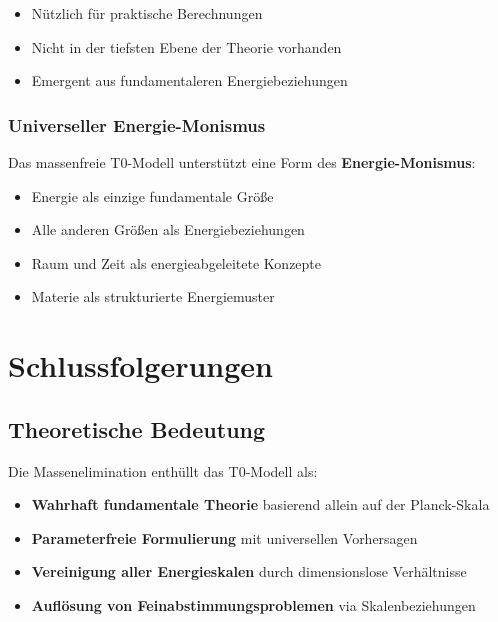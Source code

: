 	\begin{itemize}
		\item Nützlich für praktische Berechnungen
		\item Nicht in der tiefsten Ebene der Theorie vorhanden
		\item Emergent aus fundamentaleren Energiebeziehungen
	\end{itemize}
	
	\subsubsection{Universeller Energie-Monismus}
	
	Das massenfreie T0-Modell unterstützt eine Form des \textbf{Energie-Monismus}:
	\begin{itemize}
		\item Energie als einzige fundamentale Größe
		\item Alle anderen Größen als Energiebeziehungen
		\item Raum und Zeit als energieabgeleitete Konzepte
		\item Materie als strukturierte Energiemuster
	\end{itemize}
	
	\section{Schlussfolgerungen}
	\label{sec:conclusions}
	
	\subsection{Theoretische Bedeutung}
	\label{subsec:theoretical_significance}
	
	Die Massenelimination enthüllt das T0-Modell als:
	
	\begin{tcolorbox}[colback=green!5!white,colframe=green!75!black,title=T0-Modell: Wahre Natur]
		\begin{itemize}
			\item \textbf{Wahrhaft fundamentale Theorie} basierend allein auf der Planck-Skala
			\item \textbf{Parameterfreie Formulierung} mit universellen Vorhersagen
			\item \textbf{Vereinigung aller Energieskalen} durch dimensionslose Verhältnisse
			\item \textbf{Auflösung von Feinabstimmungsproblemen} via Skalenbeziehungen
		\end{itemize}
	\end{tcolorbox}
	
